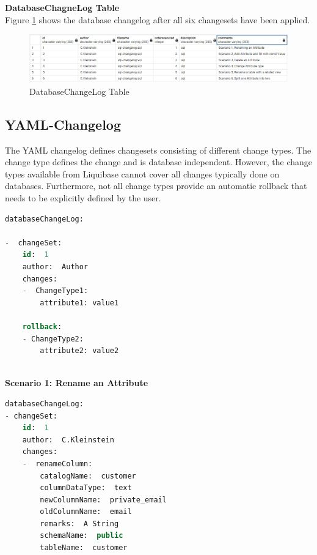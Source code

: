 \textbf{DatabaseChagneLog Table}\\
%
Figure \ref{fig:scenarios:LiquibaseDBCLSQL} shows the database changelog after all six changesets have been applied.

\begin{figure}[H]
	\centering
	\includegraphics[width=\textwidth]{./chapters/scenarios/images/databasechangelogSQL}
	\caption[DatabaseChangeLog Table - Source: Own illustration]{DatabaseChangeLog Table}
	\label{fig:scenarios:LiquibaseDBCLSQL}
\end{figure}

\subsection{YAML-Changelog}
%
The YAML changelog defines changesets consisting of different change types. The change type defines the change and is database independent. However, the change types available from Liquibase cannot cover all changes typically done on databases. Furthermore, not all change types provide an automatic rollback that needs to be explicitly defined by the user.
\newpage

\begin{lstlisting}[language=SQL, caption={YAML Changelog with Example Changeset}, label=list:scenarios:LiquibaseYAMLChangesetExample]
databaseChangeLog:  

-  changeSet:  
	id:  1  
	author:  Author 
	changes:  
	-  ChangeType1:
		attribute1: value1
		
	rollback:  
	- ChangeType2:
		attribute2: value2
 
\end{lstlisting}

\textbf{Scenario 1: Rename an Attribute}\\
%
\begin{lstlisting}[language=SQL, caption={YAML Changeset Scenario 1: Rename an Attribute}, label=list:scenarions:LiquibaseYAMLScen1]
databaseChangeLog:
- changeSet:  
	id:  1  
	author:  C.Kleinstein  
	changes:  
	-  renameColumn:  
		catalogName:  customer  
		columnDataType:  text  
		newColumnName:  private_email  
		oldColumnName:  email 
		remarks:  A String  
		schemaName:  public  
		tableName:  customer
\end{lstlisting}

